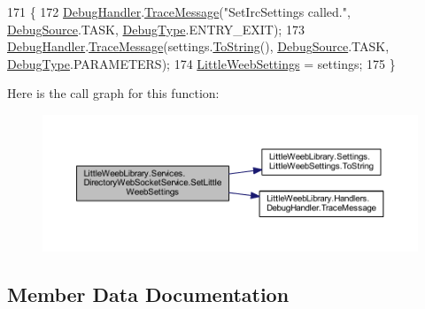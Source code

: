 \begin{DoxyCode}
171         \{
172             \mbox{\hyperlink{class_little_weeb_library_1_1_handlers_1_1_debug_handler}{DebugHandler}}.\mbox{\hyperlink{class_little_weeb_library_1_1_handlers_1_1_debug_handler_afccb37dfd6b2114af72000c2f4fe4607}{TraceMessage}}(\textcolor{stringliteral}{"SetIrcSettings called."}, 
      \mbox{\hyperlink{namespace_little_weeb_library_1_1_handlers_a2a6ca0775121c9c503d58aa254d292be}{DebugSource}}.TASK, \mbox{\hyperlink{namespace_little_weeb_library_1_1_handlers_ab66019ed40462876ec4e61bb3ccb0a62}{DebugType}}.ENTRY\_EXIT);
173             \mbox{\hyperlink{class_little_weeb_library_1_1_handlers_1_1_debug_handler}{DebugHandler}}.\mbox{\hyperlink{class_little_weeb_library_1_1_handlers_1_1_debug_handler_afccb37dfd6b2114af72000c2f4fe4607}{TraceMessage}}(settings.\mbox{\hyperlink{class_little_weeb_library_1_1_settings_1_1_little_weeb_settings_a5a5b722dd8e117be810022882795b6ae}{ToString}}(), 
      \mbox{\hyperlink{namespace_little_weeb_library_1_1_handlers_a2a6ca0775121c9c503d58aa254d292be}{DebugSource}}.TASK, \mbox{\hyperlink{namespace_little_weeb_library_1_1_handlers_ab66019ed40462876ec4e61bb3ccb0a62}{DebugType}}.PARAMETERS);
174             \mbox{\hyperlink{class_little_weeb_library_1_1_settings_1_1_little_weeb_settings}{LittleWeebSettings}} = settings;
175         \}
\end{DoxyCode}
Here is the call graph for this function\+:\nopagebreak
\begin{figure}[H]
\begin{center}
\leavevmode
\includegraphics[width=350pt]{class_little_weeb_library_1_1_services_1_1_directory_web_socket_service_a015a3ae2bb0f275de152ae039fad566e_cgraph}
\end{center}
\end{figure}


\subsection{Member Data Documentation}
\mbox{\label{class_little_weeb_library_1_1_services_1_1_directory_web_socket_service_abf56baaa5c2889b119df9fac310ddcec}} 
